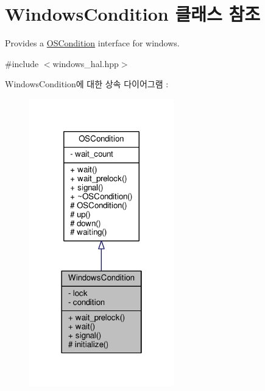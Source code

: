 \hypertarget{class_windows_condition}{}\section{Windows\+Condition 클래스 참조}
\label{class_windows_condition}


Provides a \hyperlink{class_o_s_condition}{O\+S\+Condition} interface for windows.  




{\ttfamily \#include $<$windows\+\_\+hal.\+hpp$>$}



Windows\+Condition에 대한 상속 다이어그램 \+: 
\nopagebreak
\begin{figure}[H]
\begin{center}
\leavevmode
\includegraphics[width=178pt]{class_windows_condition__inherit__graph}
\end{center}
\end{figure}


